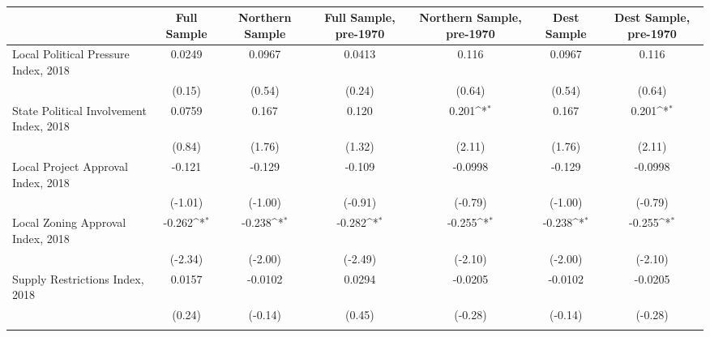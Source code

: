 \begin{table}[htbp]\centering
\def\sym#1{\ifmmode^{#1}\else\(^{#1}\)\fi}
\caption{ \label{tab1}}
\begin{tabular}{l*{6}{c}}
\toprule
                    &\multicolumn{1}{c}{Full Sample}&\multicolumn{1}{c}{Northern Sample}&\multicolumn{1}{c}{Full Sample, pre-1970}&\multicolumn{1}{c}{Northern Sample, pre-1970}&\multicolumn{1}{c}{Dest Sample}&\multicolumn{1}{c}{Dest Sample, pre-1970}\\
\midrule
Local Political Pressure Index, 2018&      0.0249         &      0.0967         &      0.0413         &       0.116         &      0.0967         &       0.116         \\
                    &      (0.15)         &      (0.54)         &      (0.24)         &      (0.64)         &      (0.54)         &      (0.64)         \\
\addlinespace
State Political Involvement Index, 2018&      0.0759         &       0.167         &       0.120         &       0.201\sym{*}  &       0.167         &       0.201\sym{*}  \\
                    &      (0.84)         &      (1.76)         &      (1.32)         &      (2.11)         &      (1.76)         &      (2.11)         \\
\addlinespace
Local Project Approval Index, 2018&      -0.121         &      -0.129         &      -0.109         &     -0.0998         &      -0.129         &     -0.0998         \\
                    &     (-1.01)         &     (-1.00)         &     (-0.91)         &     (-0.79)         &     (-1.00)         &     (-0.79)         \\
\addlinespace
Local Zoning Approval Index, 2018&      -0.262\sym{*}  &      -0.238\sym{*}  &      -0.282\sym{*}  &      -0.255\sym{*}  &      -0.238\sym{*}  &      -0.255\sym{*}  \\
                    &     (-2.34)         &     (-2.00)         &     (-2.49)         &     (-2.10)         &     (-2.00)         &     (-2.10)         \\
\addlinespace
Supply Restrictions Index, 2018&      0.0157         &     -0.0102         &      0.0294         &     -0.0205         &     -0.0102         &     -0.0205         \\
                    &      (0.24)         &     (-0.14)         &      (0.45)         &     (-0.28)         &     (-0.14)         &     (-0.28)         \\
\addlinespace

\end{tabular}
\end{table}
